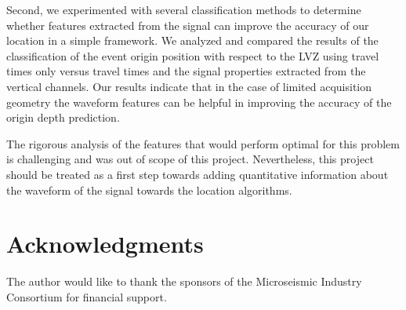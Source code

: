 Second, we experimented with several classification methods to determine whether features extracted from the signal can improve the accuracy of our location in a simple framework. We analyzed and compared the results of the classification of the event origin position with respect to the LVZ using travel times only versus travel times and the signal properties extracted from the vertical channels. Our results indicate that in the case of limited acquisition geometry the waveform features can be helpful in improving the accuracy of the origin depth prediction. 

The rigorous analysis of the features that would perform optimal for this problem is challenging and was out of scope of this project. Nevertheless, this project should be treated as a first step towards adding quantitative information about the waveform of the signal towards the location algorithms.




\section{Acknowledgments}
%
The author would like to thank the sponsors of the Microseismic Industry Consortium for financial support.
%

% 
\clearpage
\nocite{*}
 
